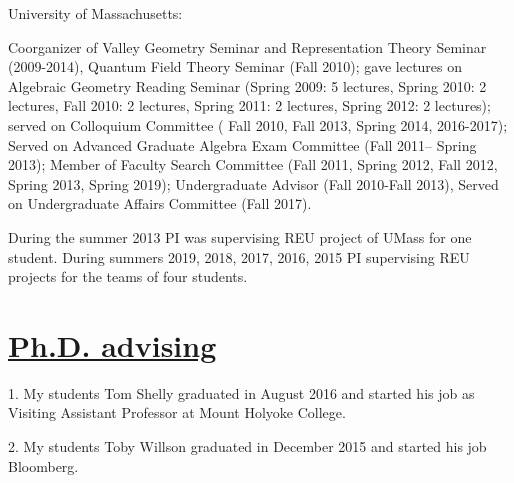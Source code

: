\documentclass[11pt]{amsart}
\theoremstyle{plain}
\theoremstyle{definition}
\theoremstyle{remark}
\begin{document}
\medskip

\noindent University of Massachusetts:

\noindent Coorganizer of Valley Geometry Seminar and Representation Theory Seminar (2009-2014), Quantum Field Theory Seminar (Fall 2010);
gave   lectures on Algebraic Geometry Reading Seminar (Spring 2009: 5 lectures, Spring 2010: 2 lectures, Fall 2010: 2 lectures, Spring 2011: 2 lectures, Spring 2012: 2 lectures); 
served on Colloquium Committee ( Fall 2010, Fall 2013, Spring 2014, 2016-2017); 
Served on Advanced Graduate Algebra Exam Committee (Fall 2011-- Spring 2013); Member of Faculty Search Committee 
(Fall 2011, Spring 2012, Fall 2012, Spring 2013, Spring 2019); 
Undergraduate Advisor (Fall 2010-Fall 2013), Served on Undergraduate Affairs Committee (Fall 2017).


\medskip

\noindent During the summer 2013 PI was supervising REU project of
UMass for one student. During summers 2019, 2018, 2017, 2016, 2015 PI supervising
REU projects for the teams of four students. 


\section*{\Large \underline{Ph.D. advising}}

\medskip

1. My students Tom Shelly graduated in August 2016 and started his job as Visiting Assistant Professor at Mount Holyoke College. 

2. My students Toby Willson graduated in December 2015 and started his job Bloomberg. 



\end{document}
